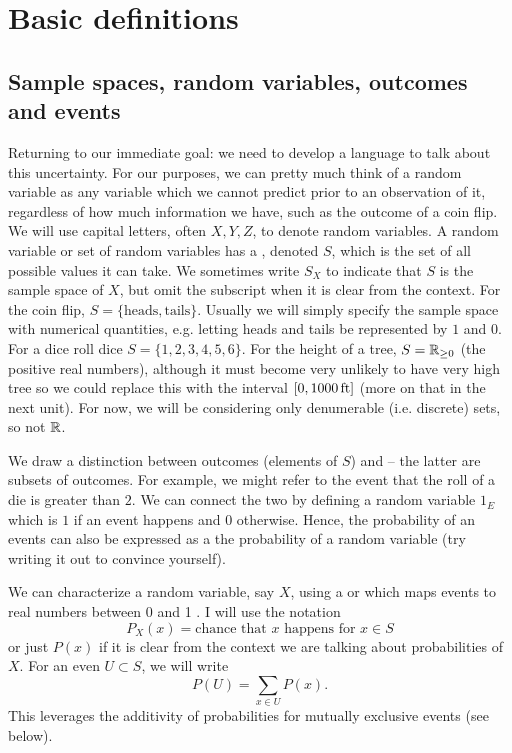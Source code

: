 \section{Basic definitions}
\subsection{Sample spaces, random variables, outcomes and events}
Returning to our immediate goal: we need to develop a language to talk about this uncertainty.
For our purposes, we can pretty much think of a random variable as any variable which we cannot predict prior to an observation of it, regardless of how much information we have, such as the outcome of a coin flip.  We will use capital letters, often $X,Y,Z$, to denote random variables. A random variable or set of random variables has a , denoted $S$, which is the set of all possible values it can take. We sometimes write $S_X$ to indicate that $S$ is the sample space of $X$, but omit the subscript when it is clear from the context.  For the coin flip, $S = \{\text{heads},\text{tails}\}$.  Usually we will simply specify the sample space with numerical quantities, e.g. letting heads and tails be represented by $1$ and $0$.   For a dice roll dice $S = \{1,2,3,4,5,6\}$. For the height of a tree, $S = \mathbb R_{\ge 0}$ (the positive real numbers), although it must become very unlikely to have very high tree so we could replace this with the interval $[0,1000\,{\rm ft}]  $ (more on that in the next unit). For now, we will be considering only denumerable (i.e. discrete) sets, so not $\mathbb R$. 
 

We draw a distinction  between outcomes (elements of $S$) and  -- the latter are subsets of outcomes. For example, we might refer to the event that the roll of a die is greater than $2$. We can connect the two by defining a random variable $1_E$ which is $1$ if an event happens and $0$ otherwise. Hence, the probability of an events can also be expressed as a the probability of a random variable (try writing it out to convince yourself). 

 
  
 We can characterize a random variable, say $X$, using  a  or which maps events to real numbers between 0 and 1 \cite[Definition 1.2.1]{evans}. I will use the notation 
\begin{equation*}
P_X(x) = \text{chance that $x$ happens for $x \in S$} 
\end{equation*}
or just $P(x)$ if it is clear from the context we are talking about probabilities of $X$. For an even $U \subset S$, we will write
\begin{equation}
P(U) = \sum_{x \in U}P(x).
\end{equation}
This leverages the additivity of probabilities for mutually exclusive events (see below).


